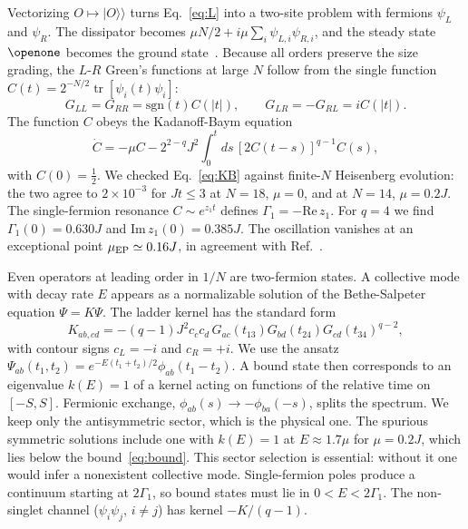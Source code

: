 \documentclass[aps,pre,twocolumn,superscriptaddress,amsmath,amssymb,10pt]{revtex4-2}
\newcommand{\tr}{\operatorname{tr}}
\begin{document}
Vectorizing $O\mapsto|O\rangle\!\rangle$ turns Eq.~\eqref{eq:L} into a two-site problem with fermions $\psi_{L}$ and $\psi_{R}$. The dissipator becomes $\mu N/2+i\mu\sum_i\psi_{L,i}\psi_{R,i}$, and the steady state $\openone$ becomes the ground state~\cite{Garcia2023}. Because all orders preserve the size grading, the $L$-$R$ Green's functions at large $N$ follow from the single function $C(t)=2^{-N/2}\tr[\psi_i(t)\psi_i]$:
\begin{equation}
G_{LL}=G_{RR}=\mathrm{sgn}(t)C(|t|),\qquad G_{LR}=-G_{RL}=iC(|t|).
\end{equation}
The function $C$ obeys the Kadanoff-Baym equation
\begin{equation}
\dot C=-\mu C-2^{2-q}J^2\!\int_0^t\!ds\,[2C(t-s)]^{q-1}C(s),
\label{eq:KB}
\end{equation}
with $C(0)=\tfrac12$. We checked Eq.~\eqref{eq:KB} against finite-$N$ Heisenberg evolution: the two agree to $2\times10^{-3}$ for $Jt\le3$ at $N=18$, $\mu=0$, and at $N=14$, $\mu=0.2J$. The single-fermion resonance $C\sim e^{z_1t}$ defines $\Gamma_1=-\mathrm{Re}\,z_1$. For $q=4$ we find $\Gamma_1(0)=0.630J$ and $\mathrm{Im}\,z_1(0)=0.385J$. The oscillation vanishes at an exceptional point $\mu_{\rm EP}\simeq0.16J$, in agreement with Ref.~\cite{Garcia2023}.

Even operators at leading order in $1/N$ are two-fermion states. A collective mode with decay rate $E$ appears as a normalizable solution of the Bethe-Salpeter equation $\Psi=K\Psi$. The ladder kernel has the standard form~\cite{MS2016,Garcia2024}
\begin{equation}
K_{ab,cd}=-(q-1)J^2c_cc_d\,G_{ac}(t_{13})G_{bd}(t_{24})G_{cd}(t_{34})^{q-2},
\end{equation}
with contour signs $c_{L}=-i$ and $c_{R}=+i$. We use the ansatz $\Psi_{ab}(t_1,t_2)=e^{-E(t_1+t_2)/2}\phi_{ab}(t_1-t_2)$. A bound state then corresponds to an eigenvalue $k(E)=1$ of a kernel acting on functions of the relative time on $[-S,S]$. Fermionic exchange, $\phi_{ab}(s)\to-\phi_{ba}(-s)$, splits the spectrum. We keep only the antisymmetric sector, which is the physical one. The spurious symmetric solutions include one with $k(E)=1$ at $E\approx1.7\mu$ for $\mu=0.2J$, which lies below the bound~\eqref{eq:bound}. This sector selection is essential: without it one would infer a nonexistent collective mode. Single-fermion poles produce a continuum starting at $2\Gamma_1$, so bound states must lie in $0<E<2\Gamma_1$. The non-singlet channel ($\psi_i\psi_j$, $i\neq j$) has kernel $-K/(q-1)$.
\end{document}
